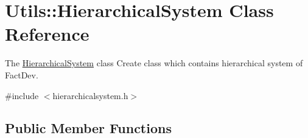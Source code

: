 \hypertarget{classUtils_1_1HierarchicalSystem}{}\section{Utils\+:\+:Hierarchical\+System Class Reference}
\label{classUtils_1_1HierarchicalSystem}


The \hyperlink{classUtils_1_1HierarchicalSystem}{Hierarchical\+System} class Create class which contains hierarchical system of Fact\+Dev.  




{\ttfamily \#include $<$hierarchicalsystem.\+h$>$}

\subsection*{Public Member Functions}
